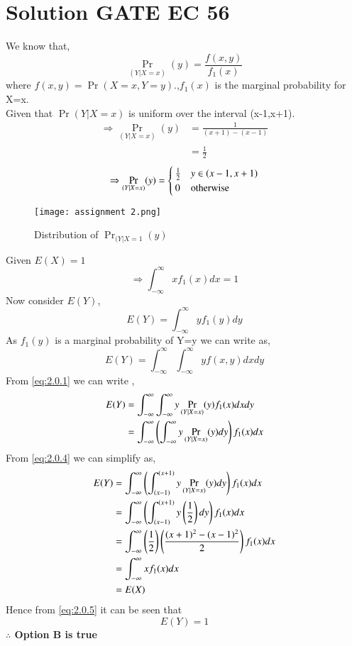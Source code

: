 \documentclass[journal,12pt,twocolumn]{IEEEtran}
\begin{document}
\section{Solution GATE EC 56}
We know that,
\begin{equation}
    \Pr_{(Y|X=x)}(y)=\frac{f(x,y)}{f_1(x)} \label{eq:2.0.1}
\end{equation}
where $f(x,y)=\Pr(X=x,Y=y)$.,$f_1(x)$ is the marginal probability for X=x.\\
Given that $\Pr{(Y|X=x)}$ is uniform over the interval (x-1,x+1).
\begin{align}
    \Rightarrow \Pr_{(Y|X=x)}(y) &= \frac{1}{(x+1)-(x-1)}\\
    &=\frac{1}{2}
\end{align}
\begin{equation}
    \Rightarrow \Pr_{(Y|X=x)}(y)=
    \begin{cases}
    \frac{1}{2} & y \in \left(x-1,x+1\right)\\
    0 & \text{otherwise}
    \end{cases}\label{eq:2.0.4}
\end{equation}
\begin{figure}[H]
    \centering
    \texttt{[image: assignment 2.png]}
    \caption{Distribution of $\Pr_{(Y|X=1}(y)$}
\end{figure}
Given $E(X)=1$
\begin{equation}
    \Rightarrow \int_{-\infty}^{\infty}x f_{1}(x)dx=1 \label{eq:2.0.5}
\end{equation}
Now consider $E(Y)$,
\begin{equation}
    E(Y)=\int_{-\infty}^{\infty}yf_{1}(y)dy
\end{equation}
As $f_{1}(y)$ is a marginal probability of Y=y we can write as,
\begin{equation}
    E(Y)=\int_{-\infty}^{\infty}\int_{-\infty}^{\infty}y f(x,y)dx dy
\end{equation}
From \ref{eq:2.0.1} we can write ,
\begin{align}
    E(Y)&=\int_{-\infty}^{\infty}\int_{-\infty}^{\infty}y \Pr_{(Y|X=x)}(y) f_{1}(x) dx dy\\
    &=\int_{-\infty}^{\infty}\left(\int_{-\infty}^{\infty}y \Pr_{(Y|X=x)}(y)dy\right) f_{1}(x) dx
\end{align}
From \ref{eq:2.0.4} we can simplify as,
\begin{align}
    E(Y)&=\int_{-\infty}^{\infty}\left(\int_{(x-1)}^{(x+1)}y \Pr_{(Y|X=x)}(y)dy\right) f_{1}(x) dx\\
    &=\int_{-\infty}^{\infty}\left(\int_{(x-1)}^{(x+1)}y \left(\frac{1}{2}\right) dy\right) f_{1}(x) dx\\
    &=\int_{-\infty}^{\infty} \left(\frac{1}{2}\right) \left(\frac{(x+1)^2-(x-1)^2}{2}\right)  f_{1}(x) dx\\
    &= \int_{-\infty}^{\infty}x f_{1}(x)dx\\
    &=E(X)
\end{align}
Hence from \ref{eq:2.0.5} it can be seen that 
\begin{equation}
    E(Y)=1
\end{equation}
\textbf{$\therefore$ Option B is true}

\end{document}
